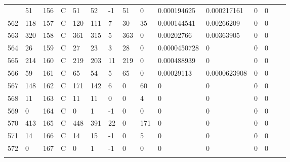 \begin{longtable}{lllllllllllllll}
\begin{comment}
	561 & 51                & 156 & C   & 51                & 52                & -1                & 51   & 0          & 0.000194625    & 0.000217161    & 0             & 0            \\
	562 & 118               & 157 & C   & 120               & 111               & 7                 & 30   & 35         & 0.000144541    & 0.00266209     & 0             & 0            \\
	563 & 320               & 158 & C   & 361               & 315               & 5                 & 363  & 0          & 0.00202766     & 0.00363905     & 0             & 0            \\
	564 & 26                & 159 & C   & 27                & 23                & 3                 & 28   & 0          & 0.0000450728   & 0              & 0             & 0            \\
	565 & 214               & 160 & C   & 219               & 203               & 11                & 219  & 0          & 0.000488939    & 0              & 0             & 0            \\
	566 & 59                & 161 & C   & 65                & 54                & 5                 & 65   & 0          & 0.00029113     & 0.0000623908   & 0             & 0            \\
	567 & 148               & 162 & C   & 171               & 142               & 6                 & 0    & 60         & 0              & 0              & 0             & 0            \\
	568 & 11                & 163 & C   & 11                & 11                & 0                 & 0    & 4          & 0              & 0              & 0             & 0            \\
	569 & 0                 & 164 & C   & 0                 & 1                 & -1                & 0    & 0          & 0              & 0              & 0             & 0            \\
	570 & 413               & 165 & C   & 448               & 391               & 22                & 0    & 171        & 0              & 0              & 0             & 0            \\
	571 & 14                & 166 & C   & 14                & 15                & -1                & 0    & 5          & 0              & 0              & 0             & 0            \\
	572 & 0                 & 167 & C   & 0                 & 1                 & -1                & 0    & 0          & 0              & 0              & 0             & 0            \\

\end{comment}
\end{longtable}
